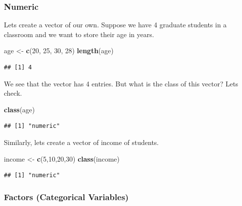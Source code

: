 \documentclass[
]{article}
\newenvironment{Shaded}{\begin{snugshade}}{\end{snugshade}}
\newcommand{\DecValTok}[1]{\textcolor[rgb]{0.00,0.00,0.81}{#1}}
\newcommand{\FunctionTok}[1]{\textcolor[rgb]{0.13,0.29,0.53}{\textbf{#1}}}
\newcommand{\NormalTok}[1]{#1}
\newcommand{\OtherTok}[1]{\textcolor[rgb]{0.56,0.35,0.01}{#1}}
\begin{document}
\subsubsection{Numeric}\label{numeric}

Lets create a vector of our own. Suppose we have 4 graduate students in
a classroom and we want to store their age in years.

\begin{Shaded}
\begin{Highlighting}[]
\NormalTok{age }\OtherTok{\textless{}{-}} \FunctionTok{c}\NormalTok{(}\DecValTok{20}\NormalTok{, }\DecValTok{25}\NormalTok{, }\DecValTok{30}\NormalTok{, }\DecValTok{28}\NormalTok{)}
\FunctionTok{length}\NormalTok{(age)}
\end{Highlighting}
\end{Shaded}

\begin{verbatim}
## [1] 4
\end{verbatim}

We see that the vector has 4 entries. But what is the class of this
vector? Lets check.

\begin{Shaded}
\begin{Highlighting}[]
\FunctionTok{class}\NormalTok{(age)}
\end{Highlighting}
\end{Shaded}

\begin{verbatim}
## [1] "numeric"
\end{verbatim}

Similarly, lets create a vector of income of students.

\begin{Shaded}
\begin{Highlighting}[]
\NormalTok{income }\OtherTok{\textless{}{-}} \FunctionTok{c}\NormalTok{(}\DecValTok{5}\NormalTok{,}\DecValTok{10}\NormalTok{,}\DecValTok{20}\NormalTok{,}\DecValTok{30}\NormalTok{)}
\FunctionTok{class}\NormalTok{(income)}
\end{Highlighting}
\end{Shaded}

\begin{verbatim}
## [1] "numeric"
\end{verbatim}

\subsubsection{Factors (Categorical
Variables)}\label{factors-categorical-variables}
\end{document}
